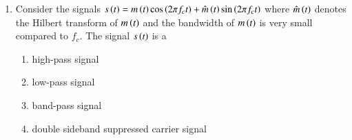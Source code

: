\documentclass[a4paper, 11pt]{article}
\begin{document}
\begin{enumerate}
    \hfill{}

    \item Consider the signals $s\left(t\right)=m\left(t\right)\cos\left(2\pi f_{c}t\right)+\hat{m}\left(t\right)\sin\left(2\pi f_{c}t\right)$ where $\hat{m}\left(t\right)$ denotes the Hilbert transform of $m\left(t\right)$ and the bandwidth of $m\left(t\right)$ is very small compared to $f_{c}$. The signal $s\left(t\right)$ is a
    \begin{enumerate}
        \item high-pass signal
        \item low-pass signal
        \item band-pass signal
        \item double sideband suppressed carrier signal
    \end{enumerate}
    
    \hfill{}


\end{enumerate}
\end{document}
